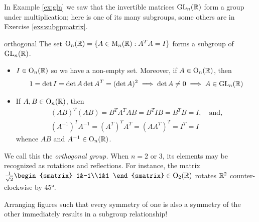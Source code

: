 
In Example \ref{ex:gln} we saw that the invertible matrices $\mathrm{GL}_n(\mathbb{R})$ form a group under multiplication; here is one of its many subgroups, some others are in Exercise \ref{exs:subgpmatrix}.

\begin{example}{}{orthogonal}
The set $\mathrm{O}_n(\mathbb{R})=\{A\in\mathrm{M}_n(\mathbb{R}):A^TA=I\}$ forms a subgroup of $\mathrm{GL}_n(\mathbb{R})$.
	\begin{itemize}\itemsep0pt
	  \item $I\in \mathrm{O}_n(\mathbb{R})$ so we have a non-empty set. Moreover, if $A\in \mathrm{O}_n(\mathbb{R})$, then
	  \[1=\det I=\det A\det A^T=(\det A)^2\implies \det A\neq 0\implies A\in\mathrm{GL}_n(\mathbb{R})\]
	  \item If $A,B\in\mathrm{O}_n(\mathbb{R})$, then
	  \begin{gather*}
	  (AB)^T(AB)=B^TA^TAB=B^TIB=B^TB=I,\quad\text{and,}\\
	  (A^{-1})^TA^{-1}=(A^T)^TA^T=(AA^T)^T=I^T=I
	  \end{gather*}
	  whence $AB$ and $A^{-1}\in\mathrm{O}_n(\mathbb{R})$.
	\end{itemize}
	We call this the \emph{orthogonal group.} When $n=2$ or 3, its elements may be recognized as rotations and reflections. For instance, the matrix $\frac 1{\sqrt 2}\begin{smatrix}
	1&-1\\1&1
	\end{smatrix}\in\rO_2(\R)$ rotates $\mathbb{R}^2$ counter-clockwise by \ang{45}.
\end{example}



\hypertarget{sec:geomdih}{}

Arranging figures such that every symmetry of one is also a symmetry of the other immediately results in a subgroup relationship!




